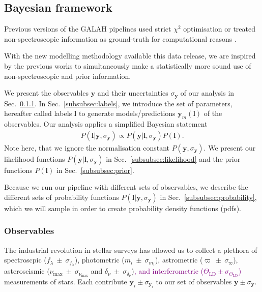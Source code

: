 \documentclass[
  journal=pasa,
  manuscript=research-paper, %
  year=2021,
  volume=37,
]{cup-journal}
\newcommand{\SB}[1]{{\textcolor{purple}{#1}}}
\begin{document}
\subsection{Bayesian framework} \label{subsec:bayes}

Previous versions of the GALAH pipelines used strict $\chi^2$ optimisation \citep{Buder2018} or treated non-spectroscopic information as ground-truth for computational reasons \citep{Buder2021}.

With the new modelling methodology available this data release, we are inspired by the previous works \citep[e.g.][]{Schoenrich2014, BailerJones2015, McMillan2018, Sharma2018} to simultaneously make a statistically more sound use of non-spectroscopic and prior information. 

We present the observables $\boldsymbol{y}$ and their uncertainties $\sigma_{\boldsymbol{y}}$ of our analysis in Sec.~\ref{subsubsec:observables}. In Sec.~\ref{subsubsec:labels}, we introduce the set of parameters, hereafter called labels $\boldsymbol{l}$ to generate models/predictions $\boldsymbol{y}_m(\boldsymbol{l})$ of the observables. Our analysis applies a simplified Bayesian statement
\begin{align}
    P( \boldsymbol{l} \vert \boldsymbol{y},\sigma_ {\boldsymbol{y}}) \propto P (\boldsymbol{y} \vert \boldsymbol{l}, \sigma_{\boldsymbol{y}}) P (\boldsymbol{l}).
\end{align}
Note here, that we ignore the normalisation constant $P(\boldsymbol{y}, \sigma_ {\boldsymbol{y}})$. We present our likelihood functions $P (\boldsymbol{y} \vert \boldsymbol{l}, \sigma_ {\boldsymbol{y}})$ in Sec.~\ref{subsubsec:likelihood} and the prior functions $P (\boldsymbol{l})$ in Sec.~\ref{subsubsec:prior}.

Because we run our pipeline with different sets of observables, we describe the different sets of probability functions $P( \boldsymbol{l} \vert \boldsymbol{y},\sigma_ {\boldsymbol{y}})$ in Sec.~\ref{subsubsec:probability}, which we will sample in order to create probability density functions (pdfs).

\subsubsection{Observables} \label{subsubsec:observables}

The industrial revolution in stellar surveys has allowed us to collect a plethora of spectroscpic ($f_\lambda~\pm~\sigma_{f_\lambda}$), photometric ($m_i~\pm~\sigma_{m_i}$), astrometric ($\varpi~\pm~\sigma_\varpi$), asteroseismic ($\nu_\text{max}~\pm~\sigma_{\nu_\text{max}}$ and $\delta_\nu~\pm~\sigma_{\delta_\nu}$)\SB{, and interferometric ($\Theta_\text{LD} \pm \sigma_{\Theta_\text{LD}}$)} measurements of stars. Each contribute ${\boldsymbol{y}_i} \pm \sigma_{\boldsymbol{y}_i}$ to our set of observables ${\boldsymbol{y}} \pm \sigma_{\boldsymbol{y}}$.
\end{document}
